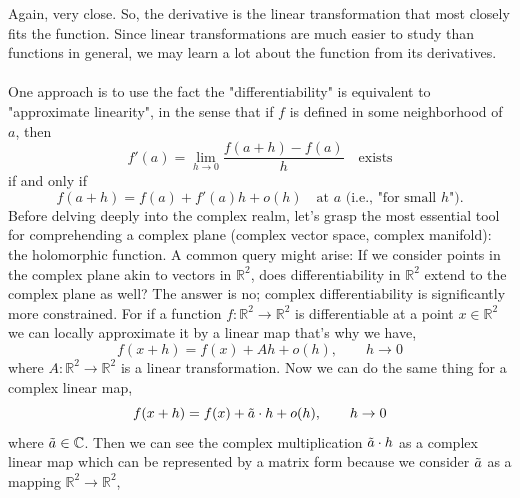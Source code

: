 Again, very close.  So, the derivative is the linear transformation that most closely fits the function.  Since linear transformations are much easier to study than functions in general, we may learn a lot about the function from its derivatives.
\\~\\
One approach is to use the fact the "differentiability" is equivalent to "approximate linearity", in the sense that if $f$ is defined in some neighborhood of $a$, then
$$
f'(a) = \lim_{h \to 0} \frac{f(a + h) - f(a)}{h}\quad\text{exists}
$$
if and only if
$$
f(a + h) = f(a) + f'(a) h + o(h)\quad\text{at $a$ (i.e., "for small $h$").}
$$
Before delving deeply into the complex realm, let's grasp the most essential tool for comprehending a complex plane (complex vector space, complex manifold): the holomorphic function. A common query might arise: If we consider points in the complex plane akin to vectors in \(\mathbb{R}^2\), does differentiability in \(\mathbb{R}^2\) extend to the complex plane as well? The answer is no; complex differentiability is significantly more constrained. For if a function $f:\mathbb R^2\rightarrow\mathbb R^2$ is differentiable at a point $x\in\mathbb R^2$ we can locally approximate it by a linear map that's why we have,
$$f(x+h)=f(x)+Ah+o(h),\qquad h\rightarrow0$$
where $A:\mathbb R^2\rightarrow\mathbb R^2$ is a linear transformation. Now we can do the same thing for a complex linear map,
$$f(x+h)=f(x)+\Tilde a\cdot h+o(h),\qquad h\rightarrow0$$
where $\Tilde a\in\mathbb C$. Then we can see the complex multiplication $\Tilde a\cdot h$ as a complex linear map which can be represented by a matrix form because we consider $\Tilde{a}$ as a mapping $\mathbb{R}^2\rightarrow\mathbb{R}^2$,

